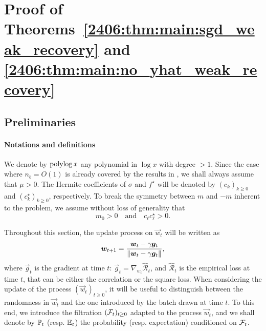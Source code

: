 \section{Proof of Theorems~\ref{2406:thm:main:sgd_weak_recovery} and \ref{2406:thm:main:no_yhat_weak_recovery}}
\label{2406:sec:app:proofs}


\subsection{Preliminaries}

\paragraph{Notations and definitions} We denote by $\operatorname{polylog} x$ any polynomial in $\log x$ with degree $> 1$. Since the case where $n_b = O(1)$ is already covered by the results in \cite{arous2021online}, we shall always assume that $\mu > 0$. The Hermite coefficients of $\sigma$ and $f^\star$ will be denoted by $(c_k)_{k \geq 0}$ and $(c_k^\star)_{k \geq 0}$, respectively. To break the symmetry between $m$ and $-m$ inherent to the problem, we assume without loss of generality that
\[m_0 > 0 \quad \text{and} \quad c_\ell c_\ell^\star > 0.\]

Throughout this section, the update process on $\vec{w}_t$ will be written as
\begin{equation}\label{2406:eq:app:one_step_w}
    {\boldsymbol{w}}_{t+1} = \frac{{\boldsymbol{w}}_t - \gamma  {\boldsymbol{g}}_t}{\left\lVert {\boldsymbol{w}}_t - \gamma  {\boldsymbol{g}}_t\right\rVert},
\end{equation}
where $\vec{g}_t$ is the gradient at time $t$: $\vec{g}_t = \nabla_{w_{t}} \hat{\mathcal{R}}_t$, and $\hat{\mathcal{R}}_t$ is the empirical loss at time $t$, that can be either the correlation or the square loss. When considering the update of the process $(\vec{w}_t)_{t \geq 0}$, it will be useful to distinguish between the randomness in $\vec{w}_t$ and the one introduced by the batch drawn at time $t$. To this end, we introduce the filtration $(\mathcal{F}_t)_{t\geq 0}$ adapted to the process $\vec{w}_t$, and we shall denote by $\mathbb{P}_t$ (resp. $\mathbb{E}_t$) the probability (resp. expectation) conditioned on $\mathcal{F}_t$.

